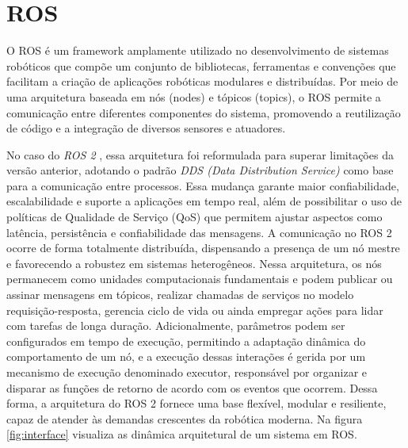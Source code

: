 \newcommand{\texCommand}[1]{\texttt{\textbackslash{#1}}}%

\newcommand{\exemplo}[1]{%
\vspace{\baselineskip}%
\noindent\fbox{\begin{minipage}{\textwidth}#1\end{minipage}}%
\\\vspace{\baselineskip}}%

\newcommand{\exemploVerbatim}[1]{%
\vspace{\baselineskip}%
\noindent\fbox{\begin{minipage}{\textwidth}%
#1\end{minipage}}%
\\\vspace{\baselineskip}}%
\label{cap:fundamentação}
\section{ROS} 
O ROS \cite{ros1} é um framework amplamente utilizado no desenvolvimento de sistemas robóticos que compõe um conjunto de bibliotecas, ferramentas e convenções que facilitam a criação de aplicações robóticas modulares e distribuídas. Por meio de uma arquitetura baseada em nós (nodes) e tópicos (topics), o ROS permite a comunicação entre diferentes componentes do sistema, promovendo a reutilização de código e a integração de diversos sensores e atuadores. 

No caso do \textit{ROS 2} \cite{ros2}, essa arquitetura foi reformulada para superar limitações da versão anterior, adotando o padrão \textit{DDS (Data Distribution Service)} como base para a comunicação entre processos. Essa mudança garante maior confiabilidade, escalabilidade e suporte a aplicações em tempo real, além de possibilitar o uso de políticas de Qualidade de Serviço (QoS) que permitem ajustar aspectos como latência, persistência e confiabilidade das mensagens. A comunicação no ROS 2 ocorre de forma totalmente distribuída, dispensando a presença de um nó mestre e favorecendo a robustez em sistemas heterogêneos. Nessa arquitetura, os nós permanecem como unidades computacionais fundamentais e podem publicar ou assinar mensagens em tópicos, realizar chamadas de serviços no modelo requisição-resposta, gerencia ciclo de vida ou ainda empregar ações para lidar com tarefas de longa duração. Adicionalmente, parâmetros podem ser configurados em tempo de execução, permitindo a adaptação dinâmica do comportamento de um nó, e a execução dessas interações é gerida por um mecanismo de execução denominado executor, responsável por organizar e disparar as funções de retorno de acordo com os eventos que ocorrem. Dessa forma, a arquitetura do ROS 2 fornece uma base flexível, modular e resiliente, capaz de atender às demandas crescentes da robótica moderna. Na figura \ref{fig:interface} visualiza as dinâmica arquitetural de um sistema em ROS.

